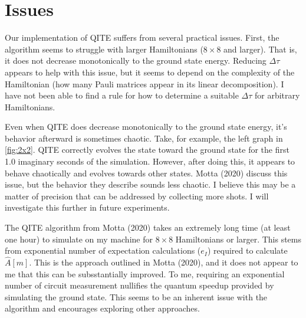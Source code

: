 \documentclass{article}
\newcounter{example}[section]
\begin{document}
\section{Issues}
\label{sec:issues}
Our implementation of QITE suffers from several practical issues. %
First, the algorithm seems to struggle with larger Hamiltonians ($8 \times 8$ and larger).
That is, it does not decrease monotonically to the ground state energy.
Reducing $\Delta \tau$ appears to help with this issue, but it seems to depend on the complexity of the Hamiltonian (how many Pauli matrices appear in its linear decomposition).
I have not been able to find a rule for how to determine a suitable $\Delta \tau$ for arbitrary Hamiltonians.

Even when QITE does decrease monotonically to the ground state energy, it's behavior afterward is sometimes chaotic.
Take, for example, the left graph in \cref{fig:2x2}.
QITE correctly evolves the state toward the ground state for the first 1.0 imaginary seconds of the simulation.
However, after doing this, it appears to behave chaotically and evolves towards other states.
Motta (2020) discuss this issue, but the behavior they describe sounds less chaotic.
I believe this may be a matter of precision that can be addressed by collecting more shots.
I will investigate this further in future experiments. 

The QITE algorithm from Motta (2020) takes an extremely long time (at least one hour) to simulate on my machine for $8 \times 8$ Hamiltonians or larger.
This stems from exponential number of expectation calculations ($e_I$) required to calculate $\hat{A}[m]$.
This is the approach outlined in Motta (2020), and it does not appear to me that this can be subsstantially improved.
To me, requiring an exponential number of circuit measurement nullifies the quantum speedup provided by simulating the ground state.
This seems to be an inherent issue with the algorithm and encourages exploring other approaches.
\end{document}
